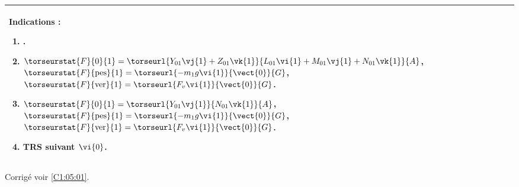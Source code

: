 \ifprof
\else
\footnotesize
\begin{center}
\begin{tabular}{|p{.9\linewidth}|}
\hline
Indications :
\begin{enumerate}
\item .
\item $\torseurstat{F}{0}{1}=\torseurl{Y_{01}\vj{1}+Z_{01}\vk{1}}{L_{01}\vi{1}+M_{01}\vj{1}+N_{01}\vk{1}}{A}$,
$\torseurstat{F}{\text{pes}}{1}=\torseurl{-m_1g\vi{1}}{\vect{0}}{G}$, 
$\torseurstat{F}{\text{ver}}{1}=\torseurl{F_v\vi{1}}{\vect{0}}{G}$.
\item $\torseurstat{F}{0}{1}=\torseurl{Y_{01}\vj{1}}{N_{01}\vk{1}}{A}$,
$\torseurstat{F}{\text{pes}}{1}=\torseurl{-m_1g\vi{1}}{\vect{0}}{G}$,
$\torseurstat{F}{\text{ver}}{1}=\torseurl{F_v\vi{1}}{\vect{0}}{G}$.
\item TRS suivant $\vi{0}$.
\end{enumerate} \\ \hline
\end{tabular}
\end{center}
\normalsize

\begin{flushright}
\footnotesize{Corrigé  voir \ref{C1:05:01}.}
\end{flushright}%
\fi


